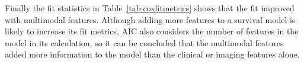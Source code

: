 
Finally the fit statistics in Table~\ref{tab:coxfitmetrics} shows that the fit improved with multimodal features.
Although adding more features to a survival model is likely to increase its fit metrics, AIC also considers the number of features in the model in its calculation, so it can be concluded that the multimodal features added more information to the model than the clinical or imaging features alone.

